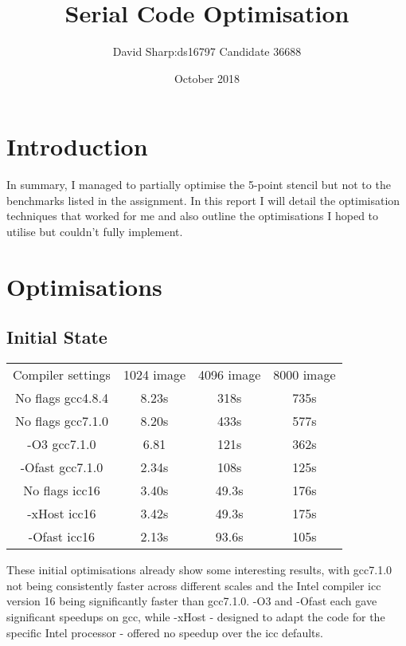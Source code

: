 \documentclass{article}
\title{Serial Code Optimisation}
\author{David Sharp:ds16797 Candidate 36688}
\date{October 2018}
\begin{document}
    \maketitle
    \section{Introduction}
    In summary, I managed to partially optimise the 5-point stencil but not to the benchmarks listed in the assignment.
    In this report I will detail the optimisation techniques that worked for me and also outline the optimisations I hoped to utilise
    but couldn't fully implement.
    \section{Optimisations}
    \subsection{Initial State}
    \begin{center}
    \begin{tabular}{ c c c c }
    Compiler settings & 1024 image & 4096 image & 8000 image \\
    No flags gcc4.8.4 & 8.23s & 318s & 735s \\
    No flags gcc7.1.0 & 8.20s & 433s & 577s \\
    -O3 gcc7.1.0 & 6.81 & 121s & 362s \\
    -Ofast gcc7.1.0 & 2.34s & 108s & 125s \\
    No flags icc16 & 3.40s & 49.3s & 176s \\
    -xHost icc16 & 3.42s & 49.3s & 175s \\
    -Ofast icc16 & 2.13s & 93.6s & 105s
    \end{tabular}
    \end{center}
    These initial optimisations already show some interesting results, with gcc7.1.0 not being consistently faster across different scales and the Intel
    compiler icc version 16 being significantly faster than gcc7.1.0.
    -O3 and -Ofast each gave significant speedups on gcc, while -xHost - designed to adapt the code for the specific Intel processor - offered no speedup
    over the icc defaults.
    
\end{document}
